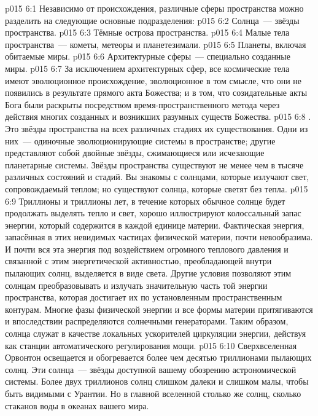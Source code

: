 \vs p015 6:1 Независимо от происхождения, различные сферы пространства можно разделить на следующие основные подразделения:
\vs p015 6:2 Солнца~--- звёзды пространства.
\vs p015 6:3 Тёмные острова пространства.
\vs p015 6:4 Малые тела пространства~--- кометы, метеоры и планетезимали.
\vs p015 6:5 Планеты, включая обитаемые миры.
\vs p015 6:6 Архитектурные сферы~--- специально созданные миры.
\vs p015 6:7 \pc За исключением архитектурных сфер, все космические тела имеют эволюционное происхождение, эволюционное в том смысле, что они не появились в результате прямого акта Божества; и в том, что созидательные акты Бога были раскрыты посредством время\hyp{}пространственного метода через действия многих созданных и возникших разумных существ Божества.
\vs p015 6:8 \pc {}. Это звёзды пространства на всех различных стадиях их существования. Одни из них~--- одиночные эволюционирующие системы в пространстве; другие представляют собой двойные звёзды, сжимающиеся или исчезающие планетарные системы. Звёзды пространства существуют не менее чем в тысяче различных состояний и стадий. Вы знакомы с солнцами, которые излучают свет, сопровождаемый теплом; но существуют солнца, которые светят без тепла.
\vs p015 6:9 Триллионы и триллионы лет, в течение которых обычное солнце будет продолжать выделять тепло и свет, хорошо иллюстрируют колоссальный запас энергии, который содержится в каждой единице материи. Фактическая энергия, запасённая в этих невидимых частицах физической материи, почти невообразима. И почти вся эта энергия под воздействием огромного теплового давления и связанной с этим энергетической активностью, преобладающей внутри пылающих солнц, выделяется в виде света. Другие условия позволяют этим солнцам преобразовывать и излучать значительную часть той энергии пространства, которая достигает их по установленным пространственным контурам. Многие фазы физической энергии и все формы материи притягиваются и впоследствии распределяются солнечными генераторами. Таким образом, солнца служат в качестве локальных ускорителей циркуляции энергии, действуя как станции автоматического регулирования мощи.
\vs p015 6:10 Сверхвселенная Орвонтон освещается и обогревается более чем десятью триллионами пылающих солнц. Эти солнца~--- звёзды доступной вашему обозрению астрономической системы. Более двух триллионов солнц слишком далеки и слишком малы, чтобы быть видимыми с Урантии. Но в главной вселенной столько же солнц, сколько стаканов воды в океанах вашего мира.
